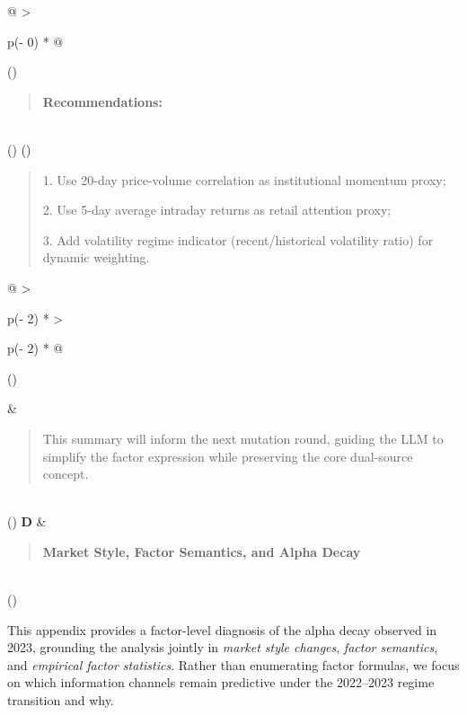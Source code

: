 \documentclass[
]{article}
\begin{document}
\begin{longtable}[]{@{}
  >{\raggedright\arraybackslash}p{(\columnwidth - 0\tabcolsep) * }@{}}
\toprule()
\begin{minipage}[b]{\linewidth}\raggedright
\begin{quote}
\textbf{Recommendations:}
\end{quote}
\end{minipage} \\
\midrule()
\endhead
\bottomrule()
\end{longtable}

\begin{quote}
1. Use 20-day price-volume correlation as institutional momentum proxy;

2. Use 5-day average intraday returns as retail attention proxy;

3. Add volatility regime indicator (recent/historical volatility ratio)
for dynamic weighting.
\end{quote}

\begin{longtable}[]{@{}
  >{\raggedright\arraybackslash}p{(\columnwidth - 2\tabcolsep) * }
  >{\raggedright\arraybackslash}p{(\columnwidth - 2\tabcolsep) * }@{}}
\toprule()
\begin{minipage}[b]{\linewidth}\raggedright
\end{minipage} & \begin{minipage}[b]{\linewidth}\raggedright
\begin{quote}
This summary will inform the next mutation round, guiding the LLM to
simplify the factor expression while preserving the core dual-source
concept.
\end{quote}
\end{minipage} \\
\midrule()
\endhead
\textbf{D} & \begin{minipage}[t]{\linewidth}\raggedright
\begin{quote}
\textbf{Market Style, Factor Semantics, and Alpha Decay}
\end{quote}
\end{minipage} \\
\bottomrule()
\end{longtable}

This appendix provides a factor-level diagnosis of the alpha decay
observed in 2023, grounding the analysis jointly in \emph{market style
changes}, \emph{factor semantics}, and \emph{empirical factor
statistics}. Rather than enumerating factor formulas, we focus on which
information channels remain predictive under the 2022--2023 regime
transition and why.
\end{document}
